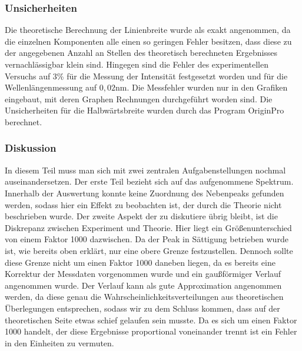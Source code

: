 \documentclass[
	a4paper,
	12pt,
	pagesize,
	ngerman
]{scrartcl}
\begin{document}
\subsubsection{Unsicherheiten}
Die theoretische Berechnung der Linienbreite wurde als exakt angenommen, da die einzelnen Komponenten alle einen so geringen Fehler besitzen, dass diese zu der angegebenen Anzahl an Stellen des theoretisch berechneten Ergebnisses vernachlässigbar klein sind.
Hingegen sind die Fehler des experimentellen Versuchs auf 3\% für die Messung der Intensität festgesetzt worden und für die Wellenlängenmessung auf
$0,02$nm. Die Messfehler wurden nur in den Grafiken eingebaut, mit deren Graphen Rechnungen durchgeführt worden sind. Die Unsicherheiten für die Halbwärtsbreite wurden durch das Program OriginPro berechnet. 


\subsubsection{Diskussion}
In diesem Teil muss man sich mit zwei zentralen Aufgabenstellungen nochmal auseinandersetzen. Der erste Teil bezieht sich auf das aufgenommene Spektrum. 
Innerhalb der Auswertung konnte keine Zuordnung des Nebenpeaks gefunden werden, sodass hier ein Effekt zu beobachten ist, der durch die Theorie nicht beschrieben wurde. 
Der zweite Aspekt der zu diskutiere übrig bleibt, ist die Diskrepanz zwischen Experiment und Theorie. Hier liegt ein Größenunterschied von einem Faktor 1000 dazwischen. Da der Peak in Sättigung betrieben wurde ist, wie bereits oben erklärt, nur eine obere Grenze festzustellen. Dennoch sollte diese Grenze nicht um einen Faktor 1000 daneben liegen, da es bereits eine Korrektur der Messdaten vorgenommen wurde und ein gaußförmiger Verlauf angenommen wurde. Der Verlauf kann als gute Approximation angenommen werden, da diese genau die Wahrscheinlichkeitsverteilungen aus theoretischen Überlegungen entsprechen, sodass wir zu dem Schluss kommen, dass auf der theoretischen Seite etwas schief gelaufen sein musste. Da es sich um einen Faktor 1000 handelt, der diese Ergebnisse proportional voneinander trennt ist ein Fehler in den Einheiten zu vermuten.
\end{document}
